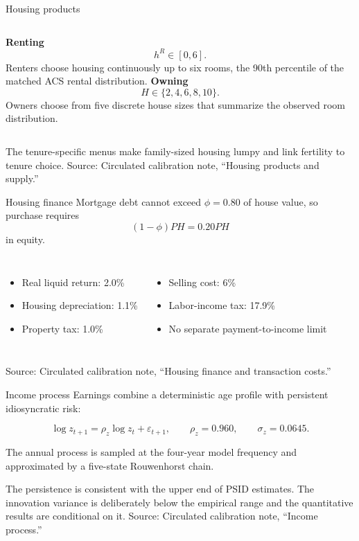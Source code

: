 \documentclass[aspectratio=169,11pt]{beamer}
\newcommand{\source}[1]{\vfill{\color{Muted}\tiny Source: #1}}
\newcommand{\tightitems}{\setlength{\itemsep}{0.55em}}
\begin{document}
\begin{frame}{Housing products}
  \begin{columns}[T,onlytextwidth]
      \large\textbf{Renting}
      \[
        h^R\in[0,6].
      \]
      Renters choose housing continuously up to six rooms, the 90th percentile of the matched ACS rental distribution.
      \large\textbf{Owning}
      \[
        H\in\{2,4,6,8,10\}.
      \]
      Owners choose from five discrete house sizes that summarize the observed room distribution.
  \end{columns}

  \vspace{1.0em}
  The tenure-specific menus make family-sized housing lumpy and link fertility to tenure choice.
  \source{Circulated calibration note, ``Housing products and supply.''}
\end{frame}

\begin{frame}{Housing finance}
  \large
  Mortgage debt cannot exceed $\phi=0.80$ of house value, so purchase requires
  \[
    (1-\phi)PH=0.20PH
  \]
  in equity.

  \vspace{0.4em}
  \begin{columns}[T,onlytextwidth]
      \begin{itemize}\tightitems
        \item Real liquid return: 2.0\%
        \item Housing depreciation: 1.1\%
        \item Property tax: 1.0\%
      \end{itemize}
      \begin{itemize}\tightitems
        \item Selling cost: 6\%
        \item Labor-income tax: 17.9\%
        \item No separate payment-to-income limit
      \end{itemize}
  \end{columns}
  \source{Circulated calibration note, ``Housing finance and transaction costs.''}
\end{frame}

\begin{frame}{Income process}
  \large
  Earnings combine a deterministic age profile with persistent idiosyncratic risk:
  \par\medskip
  \[
    \log z_{t+1}=\rho_z\log z_t+\varepsilon_{t+1},
    \qquad
    \rho_z=0.960,
    \qquad
    \sigma_z=0.0645.
  \]

  The annual process is sampled at the four-year model frequency and approximated by a five-state Rouwenhorst chain.

  \vspace{0.8em}
  The persistence is consistent with the upper end of PSID estimates. The innovation variance is deliberately below the empirical range and the quantitative results are conditional on it.
  \source{Circulated calibration note, ``Income process.''}
\end{frame}
\end{document}
